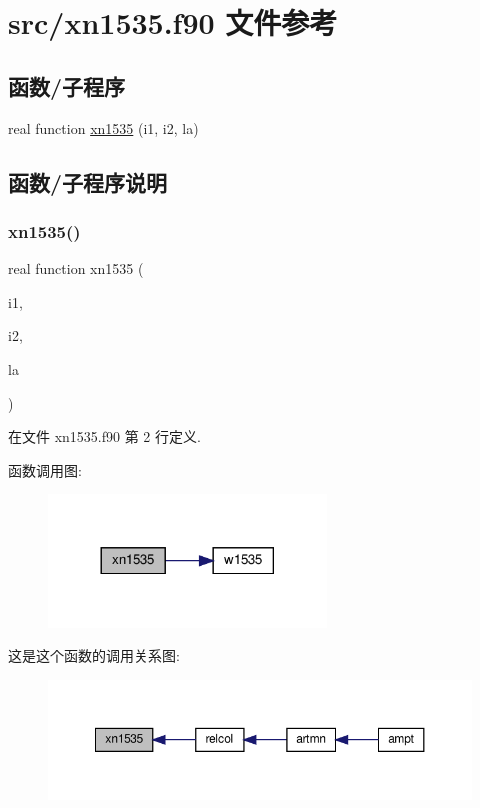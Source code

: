 \hypertarget{xn1535_8f90}{}\section{src/xn1535.f90 文件参考}
\label{xn1535_8f90}
\subsection*{函数/子程序}
\begin{DoxyCompactItemize}
\item 
real function \mbox{\hyperlink{xn1535_8f90_a3b48cdd4d5e04ca22a1209472d26eb0f}{xn1535}} (i1, i2, la)
\end{DoxyCompactItemize}


\subsection{函数/子程序说明}
\mbox{\label{xn1535_8f90_a3b48cdd4d5e04ca22a1209472d26eb0f}} 
\subsubsection{\texorpdfstring{xn1535()}{xn1535()}}
{\footnotesize\ttfamily real function xn1535 (\begin{DoxyParamCaption}\item[{}]{i1,  }\item[{}]{i2,  }\item[{}]{la }\end{DoxyParamCaption})}



在文件 xn1535.\+f90 第 2 行定义.

函数调用图\+:
\nopagebreak
\begin{figure}[H]
\begin{center}
\leavevmode
\includegraphics[width=209pt]{xn1535_8f90_a3b48cdd4d5e04ca22a1209472d26eb0f_cgraph}
\end{center}
\end{figure}
这是这个函数的调用关系图\+:
\nopagebreak
\begin{figure}[H]
\begin{center}
\leavevmode
\includegraphics[width=350pt]{xn1535_8f90_a3b48cdd4d5e04ca22a1209472d26eb0f_icgraph}
\end{center}
\end{figure}
